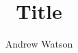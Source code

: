 \documentclass[11pt,a4paper,titlepage]{article}
\author{Andrew Watson}
\title{Title}
\begin{document}
\maketitle

\begin{abstract}
\end{abstract}
\end{document}
